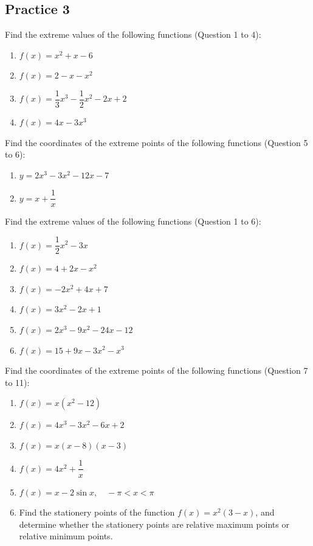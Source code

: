 \documentclass{report}
\begin{document}
\subsection{Practice 3}

Find the extreme values of the following functions (Question 1 to 4):

\begin{enumerate}
    \item $f(x)=x^2+x-6$
    \item $f(x)=2-x-x^2$
    \item $f(x)=\dfrac{1}{3} x^3-\dfrac{1}{2} x^2-2x+2$
    \item $f(x)=4 x-3 x^3$
\end{enumerate}

Find the coordinates of the extreme points of the following functions (Question
5 to 6):
\begin{enumerate}[resume]
    \item $y=2 x^3-3 x^2-12 x-7$
    \item $y=x+\dfrac{1}{x}$
\end{enumerate}

Find the extreme values of the following functions (Question 1 to 6):
\begin{enumerate}
    \item $f(x)=\dfrac{1}{2} x^2-3 x$
    \item $f(x)=4+2 x-x^2$
    \item $f(x)=-2 x^2+4 x+7$
    \item $f(x)=3 x^2-2 x+1$
    \item $f(x)=2 x^3-9 x^2-24 x-12$
    \item $f(x)=15+9 x-3 x^2-x^3$
\end{enumerate}

Find the coordinates of the extreme points of the following functions (Question
7 to 11):
\begin{enumerate}[resume]
    \item $f(x)=x\left(x^2-12\right)$
    \item $f(x)=4 x^3-3 x^2-6 x+2$
    \item $f(x)=x(x-8)(x-3)$
    \item $f(x)=4 x^2+\dfrac{1}{x}$
    \item $f(x)=x-2 \sin x, \quad-\pi<x<\pi$
    \item Find the stationery points of the function $f(x)=x^2(3-x)$, and determine
          whether the stationery points are relative maximum points or relative minimum
          points.
\end{enumerate}
\end{document}
